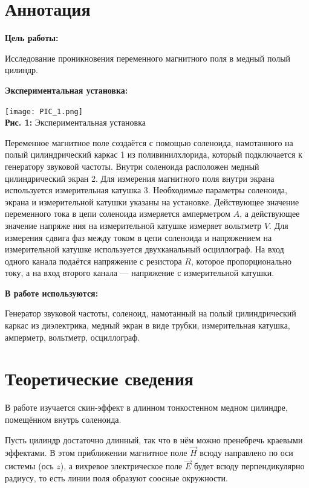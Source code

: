 \documentclass[12pt,a4paper]{scrartcl}
\begin{document}
	\section{Аннотация}
	
	\textbf{Цель работы: }
	
	Исследование проникновения переменного магнитного поля в медный полый цилиндр.
		
	\textbf{Экспериментальная установка:}
		
	\begin{center}
		\texttt{[image: PIC\_1.png]}
		\\\textbf{Рис. 1:} Экспериментальная установка
	\end{center}	

	Переменное магнитное поле создаётся с помощью соленоида, намотанного на полый цилиндрический каркас 1 из поливинилхлорида, который подключается к генератору звуковой частоты. Внутри соленоида расположен медный цилиндрический экран 2. Для измерения магнитного поля внутри экрана используется измерительная катушка 3.
	Необходимые параметры соленоида, экрана и измерительной катушки указаны на установке. Действующее значение переменного тока в цепи соленоида измеряется амперметром $A$, а действующее значение напряже	ния на измерительной катушке измеряет вольтметр $V$. Для измерения сдвига фаз между током в цепи соленоида и напряжением на измерительной катушке используется двухканальный осциллограф. На вход одного
	канала подаётся напряжение с резистора $R$, которое пропорционально току, а на вход второго канала — напряжение с измерительной катушки.
		
	\textbf{В работе используются:}
	
	Генератор звуковой частоты, соленоид, намотанный на полый цилиндрический каркас из диэлектрика, медный экран в виде трубки, измерительная катушка,	амперметр, вольтметр, осциллограф.
	
	\section{Теоретические сведения}
	
	В работе изучается скин-эффект в длинном тонкостенном медном цилиндре, помещённом внутрь соленоида.
	
	Пусть цилиндр достаточно длинный, так что в нём можно пренебречь краевыми эффектами. В этом приближении магнитное поле $\vec{H}$ всюду направлено по оси системы (ось $z$), а вихревое электрическое поле $\vec{E}$ будет всюду перпендикулярно радиусу, то есть линии поля образуют соосные окружности. 
	
\end{document}

